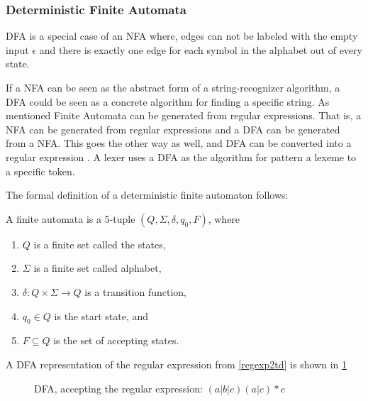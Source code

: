 \subsubsection{Deterministic Finite Automata}
DFA is a special case of an NFA where, edges can not be labeled with the empty
input $\epsilon$ and there is exactly one edge for each symbol in the alphabet
out of every state.

If a NFA can be seen as the abstract form of a string-recognizer algorithm, a
DFA could be seen as a concrete algorithm for finding a specific string. As
mentioned Finite Automata can be generated from regular expressions. That is, a
NFA can be generated from regular expressions and a DFA can be generated from a
NFA. This goes the other way as well, and DFA can be converted into a regular
expression \cite{Aho2006}. A lexer uses a DFA as the algorithm for pattern a
lexeme to a specific token.

The formal definition of a deterministic finite automaton follows:
\begin{definition} \label{finiteAutomataDef}
A finite automata is a 5-tuple $(Q, \Sigma, \delta, q_0, F)$, where
\begin{enumerate}
  \item $Q$ is a finite set called the states,
  \item $\Sigma$ is a finite set called alphabet,
  \item $\delta: Q \times \Sigma \to Q$ is a transition function,
  \item $q_0 \in Q$ is the start state, and
  \item $F \subseteq Q$ is the set of accepting states.
\end{enumerate} 
\end{definition}

\begin{example} \label{regexp2dfa}
A DFA representation of the regular expression from \cref{regexp2td} is shown in \cref{fig:dfa}
\end{example}
\begin{figure}[!h]
  \centering
  \caption{DFA, accepting the regular expression: $(a|b|c)(a|c)* c$
  \label{fig:dfa}}
\end{figure}
